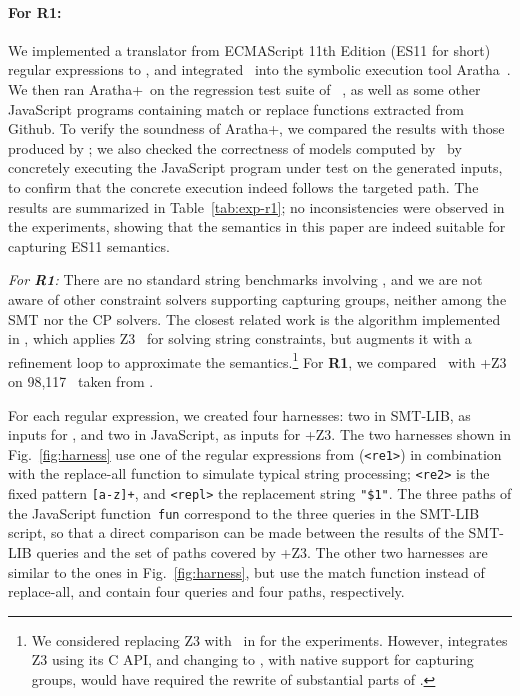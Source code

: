 %
\OMIT
{
\paragraph{For \textbf{R1}:} We implemented a translator from ECMAScript 11th Edition (ES11 for short) regular
expressions to \regexps, and integrated \ostrich\ into the symbolic
execution tool Aratha~\cite{aratha}. We then ran Aratha+\ostrich\ on
the regression test suite of \expose{}~\cite{DBLP:conf/spin/LoringMK17},
as well as some other JavaScript programs containing match or replace
functions extracted from Github. To verify the soundness of
Aratha+\ostrich, we compared the results with those produced by
\expose{}; we also checked the correctness of models computed by
\ostrich\ by concretely executing the JavaScript program under test on
the generated inputs, to confirm that the concrete execution indeed
follows the targeted path. The results are summarized in Table~\ref{tab:exp-r1};
no inconsistencies were observed in the experiments, showing that the
semantics in this paper are indeed suitable for capturing ES11
semantics.
}
\smallskip
{\em For \textbf{R1}:} There are no standard string benchmarks
involving \regexps, and we are not aware of other constraint solvers
supporting capturing groups, neither among the SMT nor the CP
solvers. %
The closest related work is the algorithm implemented in \expose{}, which
applies Z3~\cite{Z3} for solving string constraints, but augments
it with a refinement loop to approximate the {\regexp}
semantics.\footnote{We considered replacing Z3 with \ostrich\ in
  \expose{} for the experiments. However, \expose{} integrates Z3 using its
  C API, and changing to \ostrich, with native support
  for capturing groups, would have required the rewrite of substantial
  parts of \expose{}.}
%
For \textbf{R1}, we compared \ostrich\ with \expose{}+Z3 on 98,117
\regexps\ taken from \cite{DMC+19}.

For each regular expression, we created four harnesses: two in
SMT-LIB, as inputs for \ostrich, and two in JavaScript, as inputs for
\expose{}+Z3. The two harnesses shown in Fig.~\ref{fig:harness} use one of the
regular expressions from \cite{DMC+19} (\verb!<re1>!) in combination with
the replace-all function to simulate typical string processing;
\verb!<re2>! is the fixed pattern \verb![a-z]+!, and \verb!<repl>! the
replacement string \verb!"$1"!. The three paths of the JavaScript
function~\verb!fun! correspond to the three queries in the SMT-LIB
script, so that a direct comparison can be made between the results of
the SMT-LIB queries and the set of paths covered by \expose{}+Z3. The other
two harnesses are similar to the ones in Fig.~\ref{fig:harness}, but
use the match function instead of replace-all, and contain four
queries and four paths, respectively.

